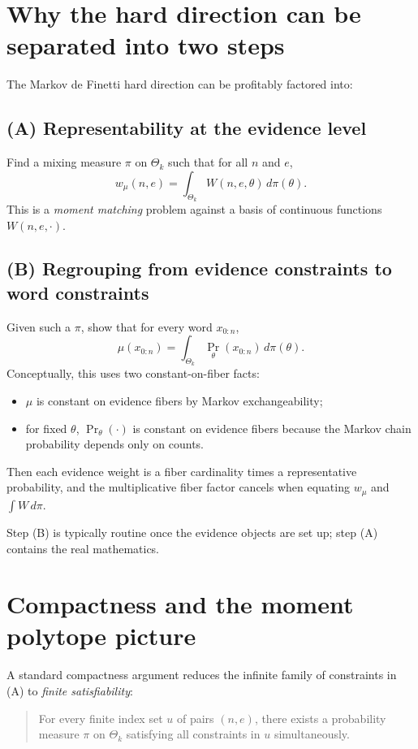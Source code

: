 \documentclass[11pt]{article}
\begin{document}
\section{Why the hard direction can be separated into two steps}

The Markov de Finetti hard direction can be profitably factored into:

\subsection{(A) Representability at the evidence level}

Find a mixing measure $\pi$ on $\Theta_k$ such that for all $n$ and $e$,
\[
w_\mu(n,e) = \int_{\Theta_k} W(n,e,\theta)\,d\pi(\theta).
\]
This is a \emph{moment matching} problem against a basis of continuous functions $W(n,e,\cdot)$.

\subsection{(B) Regrouping from evidence constraints to word constraints}

Given such a $\pi$, show that for every word $x_{0:n}$,
\[
\mu(x_{0:n}) = \int_{\Theta_k} \Pr_\theta(x_{0:n})\,d\pi(\theta).
\]
Conceptually, this uses two constant-on-fiber facts:
\begin{itemize}
\item $\mu$ is constant on evidence fibers by Markov exchangeability;
\item for fixed $\theta$, $\Pr_\theta(\cdot)$ is constant on evidence fibers
because the Markov chain probability depends only on counts.
\end{itemize}
Then each evidence weight is a fiber cardinality times a representative probability, and the
multiplicative fiber factor cancels when equating $w_\mu$ and $\int W\,d\pi$.

Step (B) is typically routine once the evidence objects are set up; step (A) contains the real
mathematics.

\section{Compactness and the moment polytope picture}

A standard compactness argument reduces the infinite family of constraints in (A) to
\emph{finite satisfiability}:

\begin{quote}
For every finite index set $u$ of pairs $(n,e)$, there exists a probability measure $\pi$ on
$\Theta_k$ satisfying all constraints in $u$ simultaneously.
\end{quote}
\end{document}
